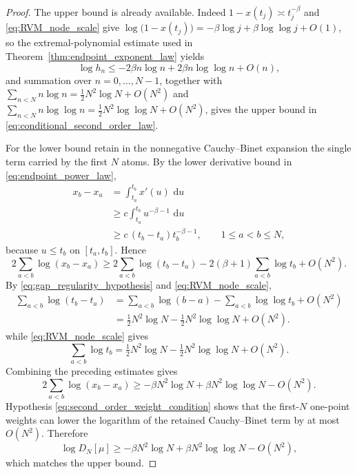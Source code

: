 \documentclass[preprint,12pt]{elsarticle}
\numberwithin{equation}{section}
\theoremstyle{plain}
\theoremstyle{definition}
\theoremstyle{remark}
\newcommand{\dd}{\,\mathrm d}
\begin{document}
\begin{proof}
The upper bound is already available. Indeed $1-x(t_j)\asymp t_j^{-\beta}$ and \eqref{eq:RVM_node_scale} give $\log\bigl(1-x(t_j)\bigr)=-\beta\log j+\beta\log\log j+O(1)$, so the extremal-polynomial estimate used in Theorem~\ref{thm:endpoint_exponent_law} yields
\begin{equation}
\log h_n\le-2\beta n\log n+2\beta n\log\log n+O(n),
\end{equation}
and summation over $n=0,\dots,N-1$, together with $\sum_{n<N}n\log n=\tfrac12N^2\log N+O(N^2)$ and $\sum_{n<N}n\log\log n=\tfrac12N^2\log\log N+O(N^2)$, gives the upper bound in \eqref{eq:conditional_second_order_law}.

For the lower bound retain in the nonnegative Cauchy--Binet expansion the single term carried by the first $N$ atoms.  By the lower derivative bound in \eqref{eq:endpoint_power_law},
\begin{align}
x_b-x_a
&=\int_{t_a}^{t_b}x'(u)\,\dd u\\
&\ge c\int_{t_a}^{t_b}u^{-\beta-1}\,\dd u\\
&\ge c\,(t_b-t_a)t_b^{-\beta-1},
\qquad 1\le a<b\le N,
\label{eq:second_order_node_gap_lower}
\end{align}
because $u\le t_b$ on $[t_a,t_b]$.  Hence
\begin{equation}
2\sum_{a<b}\log(x_b-x_a)
\ge
2\sum_{a<b}\log(t_b-t_a)
-2(\beta+1)\sum_{a<b}\log t_b
+O(N^2).
\label{eq:second_order_vandermonde_lower}
\end{equation}
By \eqref{eq:gap_regularity_hypothesis} and \eqref{eq:RVM_node_scale},
\begin{align}
\sum_{a<b}\log(t_b-t_a)
&=\sum_{a<b}\log(b-a)-\sum_{a<b}\log\log t_b+O(N^2)\\
&=\tfrac12N^2\log N-\tfrac12N^2\log\log N+O(N^2).
\end{align}
while \eqref{eq:RVM_node_scale} gives
\begin{equation}
\sum_{a<b}\log t_b=\tfrac12N^2\log N-\tfrac12N^2\log\log N+O(N^2).
\end{equation}
Combining the preceding estimates gives
\begin{equation}
2\sum_{a<b}\log(x_b-x_a)
\ge
-\beta N^2\log N+\beta N^2\log\log N-O(N^2).
\label{eq:second_order_vandermonde_final_lower}
\end{equation}
Hypothesis \eqref{eq:second_order_weight_condition} shows that the first-$N$ one-point weights can lower the logarithm of the retained Cauchy--Binet term by at most $O(N^2)$. Therefore
\begin{equation}
\log D_N[\mu]
\ge
-\beta N^2\log N+\beta N^2\log\log N-O(N^2),
\end{equation}
which matches the upper bound.


\end{proof}
\end{document}
